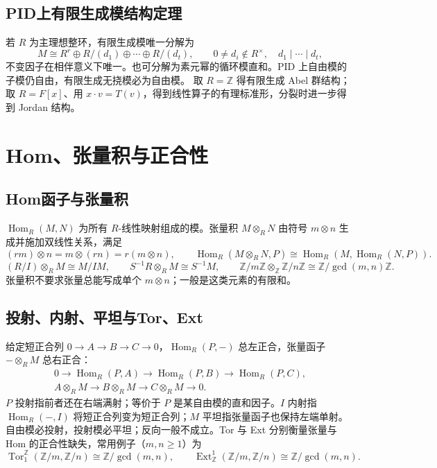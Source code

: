 \documentclass[../main.tex]{subfiles}
\begin{document}
\subsection{PID上有限生成模结构定理}
若 $R$ 为主理想整环，有限生成模唯一分解为
\[
M\cong R^r\oplus R/(d_1)\oplus\cdots\oplus R/(d_t),
\qquad 0\ne d_i\notin R^\times,\quad d_1\mid\cdots\mid d_t,
\]
不变因子在相伴意义下唯一。也可分解为素元幂的循环模直和。PID 上自由模的子模仍自由，有限生成无挠模必为自由模。
取 $R=\mathbb Z$ 得有限生成 Abel 群结构；取 $R=F[x]$、用 $x\cdot v=T(v)$，得到线性算子的有理标准形，分裂时进一步得到 Jordan 结构。
\section{Hom、张量积与正合性}
\subsection{Hom函子与张量积}
$\operatorname{Hom}_R(M,N)$ 为所有 $R$-线性映射组成的模。张量积 $M\otimes_RN$ 由符号 $m\otimes n$ 生成并施加双线性关系，满足
\[
(rm)\otimes n=m\otimes(rn)=r(m\otimes n),\qquad
\operatorname{Hom}_R(M\otimes_RN,P)\cong\operatorname{Hom}_R(M,\operatorname{Hom}_R(N,P)).
\]
\[
(R/I)\otimes_RM\cong M/IM,\qquad
S^{-1}R\otimes_RM\cong S^{-1}M,\qquad
\mathbb Z/m\mathbb Z\otimes_{\mathbb Z}\mathbb Z/n\mathbb Z\cong\mathbb Z/\gcd(m,n)\mathbb Z.
\]
张量积不要求张量总能写成单个 $m\otimes n$；一般是这类元素的有限和。
\subsection{投射、内射、平坦与Tor、Ext}
给定短正合列 $0\to A\to B\to C\to0$，$\operatorname{Hom}_R(P,-)$ 总左正合，张量函子 $-\otimes_RM$ 总右正合：
\begin{gather*}
0\to\operatorname{Hom}_R(P,A)\to\operatorname{Hom}_R(P,B)\to\operatorname{Hom}_R(P,C),\\
A\otimes_RM\to B\otimes_RM\to C\otimes_RM\to0.
\end{gather*}
$P$ 投射指前者还在右端满射；等价于 $P$ 是某自由模的直和因子。$I$ 内射指 $\operatorname{Hom}_R(-,I)$ 将短正合列变为短正合列；$M$ 平坦指张量函子也保持左端单射。
自由模必投射，投射模必平坦；反向一般不成立。Tor 与 Ext 分别衡量张量与 Hom 的正合性缺失，常用例子（$m,n\ge1$）为
\[
\operatorname{Tor}^{\mathbb Z}_1(\mathbb Z/m,\mathbb Z/n)\cong\mathbb Z/\gcd(m,n),\qquad
\operatorname{Ext}_{\mathbb Z}^1(\mathbb Z/m,\mathbb Z/n)\cong\mathbb Z/\gcd(m,n).
\]
\end{document}
